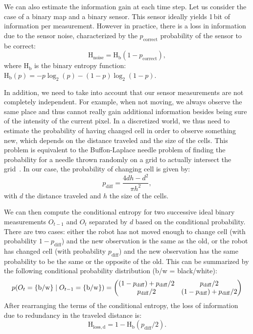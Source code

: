 \documentclass{svmult}
\newcommand{\ent}[1]{\mathrm{H}_\mathrm{#1}} %
\begin{document}
We can also estimate the information gain at each time step.
Let us consider the case of a binary map and a binary sensor.
This sensor ideally yields 1\,bit of information per measurement.
However in practice, there is a loss in information due to the sensor noise, characterized by the $p_\mathrm{correct}$ probability of the sensor to be correct:
\begin{equation}
	\ent{noise} = \ent{b}(1 - p_\mathrm{correct}),
\end{equation}
where $\ent{b}$ is the binary entropy function: $\ent{b}(p) = -p\log_2(p) - (1-p)\log_2(1-p)$.

In addition, we need to take into account that our sensor measurements are not completely independent.
For example, when not moving, we always observe the same place and thus cannot really gain additional information besides being sure of the intensity of the current pixel.
In a discretized world, we thus need to estimate the probability of having changed cell in order to observe something new, which depends on the distance traveled and the size of the cells.
This problem is equivalent to the Buffon-Laplace needle problem of finding the probability for a needle thrown randomly on a grid to actually intersect the grid~\cite{laplace1820prob}.
In our case, the probability of changing cell is given by:
\begin{equation}
	p_\mathrm{diff} = \frac{4d h - d^2}{\pi h^2},
\end{equation}
with $d$ the distance traveled and $h$ the size of the cells.

We can then compute the conditional entropy for two successive ideal binary measurements $O_{t-1}$ and $O_t$ separated by $d$ based on the conditional probability.
There are two cases: either the robot has not moved enough to change cell (with probability $1 - p_\mathrm{diff}$) and the new observation is the same as the old, or the robot has changed cell (with probability $p_\mathrm{diff}$) and the new observation has the same probability to be the same or the opposite of the old.
This can be summarized by the following conditional probability distribution ({b/w} = {black/white}):
\begin{equation}
	p(O_t=\{\mathrm{b}/\mathrm{w}\} \mid O_{t-1}=\{\mathrm{b}/\mathrm{w}\})\\
	= \begin{pmatrix}
		(1 - p_\mathrm{diff}) + p_\mathrm{diff}/2 & p_\mathrm{diff}/2\\
		p_\mathrm{diff}/2 & (1 - p_\mathrm{diff}) + p_\mathrm{diff}/2
	\end{pmatrix}
\end{equation}
After rearranging the terms of the conditional entropy, the loss of information due to redundancy in the traveled distance is:
\begin{equation}
	\ent{loss,d} = 1 - \ent{b}(p_\mathrm{diff}/2).
\end{equation}
\end{document}
